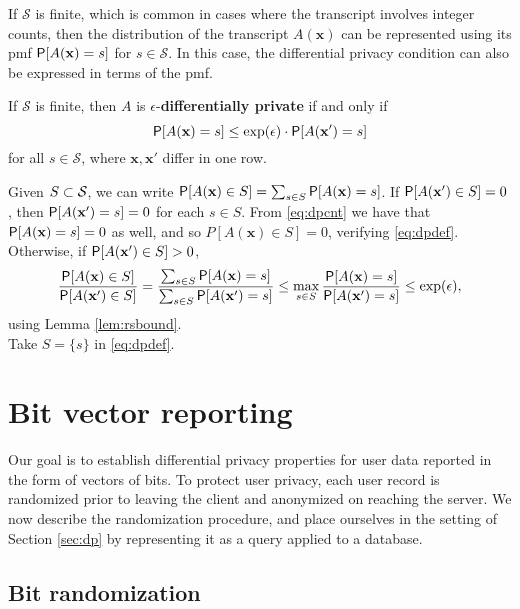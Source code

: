 \documentclass[11pt,draft]{article}
\newcommand{\Ssp}{\mathcal{S}}
\newcommand{\xv}{\mathbf{x}}
\begin{document}


If $\Ssp$ is finite, which is common in cases where the transcript involves integer counts, then the distribution of the transcript $A(\xv)$ can be represented using its pmf $\P[A(\xv) = s]$ for $s \in \Ssp$.
In this case, the differential privacy condition can also be expressed in terms of the pmf.
\begin{prop} \label{prop:dpcnt}
If $\Ssp$ is finite, then $A$ is $\epsilon$-\textbf{differentially private} if and only if
\begin{equation} \label{eq:dpcnt}
\P[A(\xv) = s] \leq \exp(\epsilon) \cdot \P[A(\xv') = s]
\end{equation}
for all $s\in\Ssp$, where $\xv,\xv'$ differ in one row.
\end{prop}
\begin{pf}
\pfleftdir
Given $S \cont \Ssp$, we can write
$\P[A(\xv) \in S] = \sum_{s \in S} \P[A(\xv) = s]$.
If $\P[A(\xv') \in S] = 0$, then $\P[A(\xv') = s] = 0$ for each $s \in S$.
From \eqref{eq:dpcnt} we have that $\P[A(\xv) = s] = 0$ as well, and so $P[A(\xv) \in S] = 0$, verifying \eqref{eq:dpdef}.
Otherwise, if $\P[A(\xv') \in S] > 0$,
\[ \frac{\P[A(\xv) \in S]}{\P[A(\xv') \in S]}
= \frac{\sum_{s \in S} \P[A(\xv) = s]}{\sum_{s \in S} \P[A(\xv') = s]}
\leq \max_{s \in S} \frac{\P[A(\xv) = s]}{\P[A(\xv') = s]}
\leq \exp(\epsilon), \]
using Lemma \ref{lem:rsbound}.\\
\pfrightdir Take $S = \{s\}$ in \eqref{eq:dpdef}.
\end{pf}



\section{Bit vector reporting}

Our goal is to establish differential privacy properties for user data reported in the form of vectors of bits.
To protect user privacy, each user record is randomized prior to leaving the client and anonymized on reaching the server.
We now describe the randomization procedure, and place ourselves in the setting of Section \ref{sec:dp} by representing it as a query applied to a database.


\subsection{Bit randomization}
\end{document}
